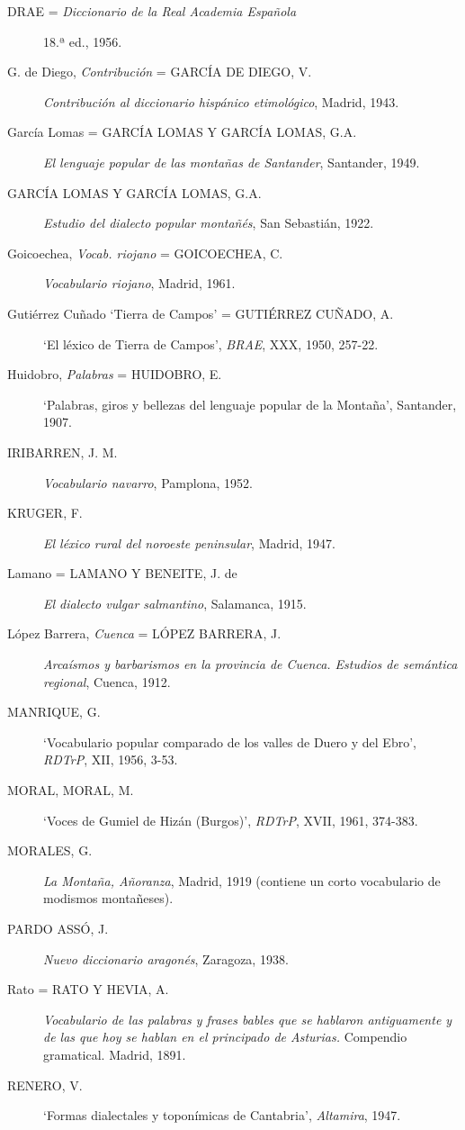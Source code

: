 \documentclass[11pt,spanish,b5paper]{book}
\begin{document}
\begin{description}
\item[DRAE = \textit{Diccionario de la Real Academia Española}] 18.ª ed., 1956.
\item[G. de Diego, \textit{Contribución} = GARCÍA DE DIEGO, V.] \textit{Contribución al diccionario hispánico etimológico}, Madrid, 1943. 
\item[García Lomas = GARCÍA LOMAS Y GARCÍA LOMAS, G.A.] \textit{El lenguaje popular de las montañas de Santander}, Santander, 1949.
\item[GARCÍA LOMAS Y GARCÍA LOMAS, G.A.] \textit{Estudio del dialecto popular montañés}, San Sebastián, 1922.
\item[Goicoechea, \textit{Vocab. riojano} = GOICOECHEA, C.]  \textit{Vocabulario riojano}, Madrid, 1961.
\item[Gutiérrez Cuñado `Tierra de Campos' = GUTIÉRREZ CUÑADO, A.] `El léxico de Tierra de Campos', \textit{BRAE}, XXX, 1950, 257-22. 
\item[Huidobro, \textit{Palabras} = HUIDOBRO, E.] `Palabras, giros y bellezas del lenguaje popular de la Montaña', Santander, 1907.   
\item[IRIBARREN, J. M.] \textit{Vocabulario navarro}, Pamplona, 1952.  
\item[KRUGER, F.] \textit{El léxico rural del noroeste peninsular}, Madrid, 1947. 
\item[Lamano = LAMANO Y BENEITE, J. de] \textit{El dialecto vulgar salmantino}, Salamanca, 1915.   
\item[López Barrera, \textit{Cuenca} = LÓPEZ BARRERA, J.] \textit{Arcaísmos y barbarismos en la provincia de Cuenca. Estudios de semántica regional}, Cuenca, 1912. 
\item[MANRIQUE, G.] `Vocabulario popular comparado de los valles de Duero y del Ebro', \textit{RDTrP}, XII, 1956, 3-53. 
\item[MORAL, MORAL, M.] `Voces de Gumiel de Hizán (Burgos)', \textit{RDTrP}, XVII, 1961, 374-383. 
\item[MORALES, G.] \textit{La Montaña, Añoranza}, Madrid, 1919 (contiene un corto vocabulario de modismos montañeses).  
\item[PARDO ASSÓ, J.] \textit{Nuevo diccionario aragonés}, Zaragoza, 1938. 
\item[Rato = RATO Y HEVIA, A.] \textit{Vocabulario de las palabras y frases bables que se hablaron antiguamente y de las que hoy se hablan en el principado de Asturias.} Compendio gramatical. Madrid, 1891. 
\item[RENERO, V.] `Formas dialectales y toponímicas de Cantabria', \textit{Altamira}, 1947.  

\end{description}
\end{document}
